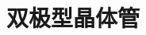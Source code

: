 \documentclass[cn,11pt,chinese,black,simple]{../elegantbook}
\begin{document}
\fi 
\def\chapname{08bjt}

\chapter{双极型晶体管}




\let\chapname\undefined
\ifx\mainclass\undefined
\end{document}
